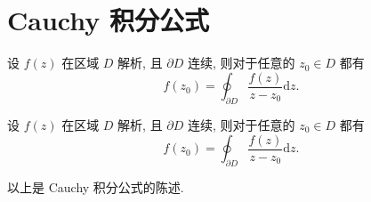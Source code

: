     \section{Cauchy 积分公式}
        \begin{theorem}
            设 $f\left(z\right)$ 在区域 $D$ 解析, 且 $\partial D$ 连续, 则对于任意的 $z_0\in D$ 都有
            $$
            f\left(z_0\right) = \oint_{\partial D}{\dfrac{f\left(z\right)}{z-z_0}\mathrm{d}z}.
            $$
        \end{theorem}
        \begin{theorem}
            设 $f\left(z\right)$ 在区域 $D$ 解析, 且 $\partial D$ 连续, 则对于任意的 $z_0\in D$ 都有
            $$
            f\left(z_0\right) = \oint_{\partial D}{\dfrac{f\left(z\right)}{z-z_0}\mathrm{d}z}.
            $$
        \end{theorem}
        以上是 Cauchy 积分公式的陈述.